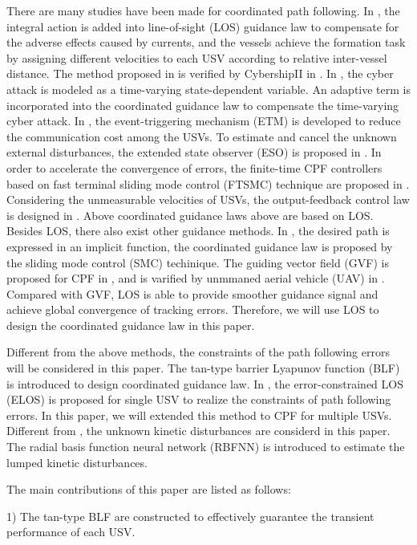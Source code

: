 \documentclass[english]{cccconf}
\begin{document}
There are many studies have been made for coordinated path following. In \cite{bib1}, the integral action is added into line-of-sight (LOS) guidance law to compensate for the adverse effects caused by currents, and the vessels achieve the formation task by assigning different velocities to each USV according to relative inter-vessel distance. The method proposed in \cite{bib1} is verified by CybershipII in \cite{bib2}. In \cite{bib3}, the cyber attack is modeled as a time-varying state-dependent variable. An adaptive term is incorporated into the coordinated guidance law to compensate the time-varying cyber attack. In \cite{bib4}, the event-triggering mechanism (ETM) is developed to reduce the communication cost among the USVs.  To estimate and cancel the unknown external disturbances, the extended state observer (ESO) is proposed in \cite{bib5}. In order to accelerate the convergence of errors, the finite-time CPF controllers based on fast terminal sliding mode control (FTSMC) technique are proposed in \cite{bib6}. Considering the unmeasurable velocities of USVs, the output-feedback control law is designed in \cite{bib7}. Above coordinated guidance laws above are based on LOS. Besides LOS, there also exist other guidance methods. In \cite{bib8}, the desired path is expressed in an implicit function, the coordinated guidance law is proposed by the sliding mode control (SMC) techinique. The guiding vector field (GVF) is proposed for CPF in \cite{bib9}, and is varified by unmmaned aerial vehicle (UAV) in \cite{bib10}.  Compared with GVF, LOS is able to provide smoother guidance signal and achieve global convergence of tracking errors. Therefore, we will use LOS to design the coordinated guidance law in this paper. 

Different from the above methods, the constraints of the path following errors will be considered in this paper. The tan-type barrier Lyapunov function (BLF) is introduced to design coordinated guidance law. In \cite{bib11}, the error-constrained LOS (ELOS) is proposed for single USV to realize the constraints of path following errors. In this paper, we will extended this method to CPF for multiple USVs. Different from \cite{bib12}, the unknown kinetic disturbances are considerd in this paper. The radial basis function neural network (RBFNN) is introduced to estimate the lumped kinetic disturbances. 

The main contributions of this paper are listed as follows:

1) The tan-type BLF are constructed to effectively guarantee the transient performance of each USV.
\end{document}
